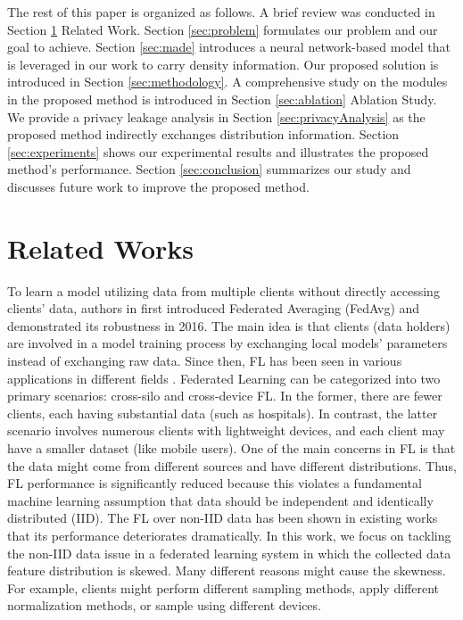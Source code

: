 \documentclass[journal]{IEEEtai}
\begin{document}
The rest of this paper is organized as follows. A brief review was conducted in Section \ref{sec:relatedwork} Related Work. Section \ref{sec:problem} formulates our problem and our goal to achieve. Section \ref{sec:made} introduces a neural network-based model that is leveraged in our work to carry density information. Our proposed solution is introduced in Section \ref{sec:methodology}. A comprehensive study on the modules in the proposed method is introduced in Section \ref{sec:ablation} Ablation Study. We provide a privacy leakage analysis in Section \ref{sec:privacyAnalysis} as the proposed method indirectly exchanges distribution information. Section \ref{sec:experiments} shows our experimental results and illustrates the proposed method's performance. Section \ref{sec:conclusion} summarizes our study and discusses future work to improve the proposed method.     

\section{Related Works}
\label{sec:relatedwork}
To learn a model utilizing data from multiple clients without directly accessing clients' data, authors in \cite{OriginFL} first introduced Federated Averaging (FedAvg) and demonstrated its robustness in 2016. The main idea is that clients (data holders) are involved in a model training process by exchanging local models' parameters instead of exchanging raw data. Since then, FL has been seen in various applications in different fields \cite{abs-1811-03604,yadav_federated_2022,feki_federated_2021,zhai_dynamic_2021, distributedQuantum, hierarchicalFL}. Federated Learning can be categorized into two primary scenarios: cross-silo and cross-device FL. In the former, there are fewer clients, each having substantial data (such as hospitals). In contrast, the latter scenario involves numerous clients with lightweight devices, and each client may have a smaller dataset (like mobile users). One of the main concerns in FL is that the data might come from different sources and have different distributions. Thus, FL performance is significantly reduced because this violates a fundamental machine learning assumption that data should be independent and identically distributed (IID). The FL over non-IID data has been shown in existing works \cite{ZHU2021371,Sahu2018OnTC,9392310,abs_1905_06641,Shen2020FederatedML,9155494,abs-2102-02079,abs-2005-11418,FLviaIntel} that its performance deteriorates dramatically. In this work, we focus on tackling the non-IID data issue in a federated learning system in which the collected data feature distribution is skewed. Many different reasons might cause the skewness. For example, clients might perform different sampling methods, apply different normalization methods, or sample using different devices. 
\end{document}
